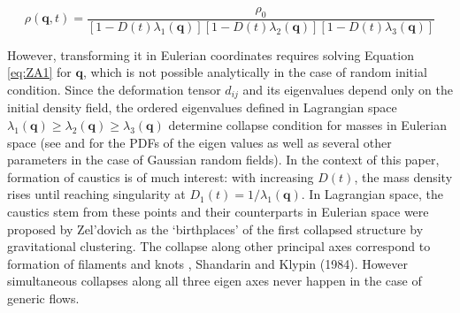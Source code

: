 \begin{equation}
 \rho(\mathbf{q}, t) = \frac{\rho_0}{ \left[1 - D(t) \lambda_1(\mathbf{q}) \right]\left[1 - D(t) \lambda_2(\mathbf{q}) \right]\left[1 - D(t) \lambda_3(\mathbf{q}) \right] }
\end{equation}

However, transforming it in Eulerian coordinates requires solving Equation \ref{eq:ZA1} for $\mathbf{q}$, which is not possible analytically in the case of random initial condition. Since the deformation tensor $d_{ij}$ and its eigenvalues depend only on the initial density field, the ordered eigenvalues defined in Lagrangian space $\lambda_1(\mathbf{q}) \geq \lambda_2(\mathbf{q}) \geq \lambda_3(\mathbf{q})$ determine collapse condition for masses in Eulerian space (see \cite{Doroshkevich1970} and \cite{Lee1998} {for the PDFs  of the eigen values as well as several other parameters} in the case of Gaussian random fields). In the context of this paper, formation of caustics is of much interest: with increasing $D(t)$, the mass density rises until reaching singularity at $D_{1}(t) = 1/\lambda_1(\mathbf{q})$. In Lagrangian space, the caustics stem from these points and their counterparts  in Eulerian space were proposed by Zel'dovich as the `birthplaces' of the first collapsed structure by gravitational clustering. The collapse along other principal axes correspond to formation of filaments and knots \citep{Arnold1982}, Shandarin and Klypin (1984). However simultaneous collapses along all three eigen axes never happen in the case of generic flows.

